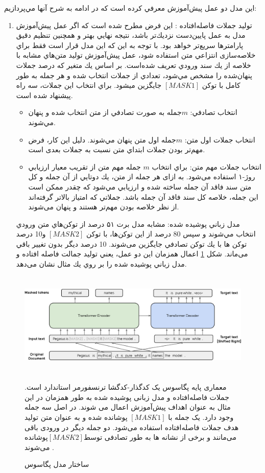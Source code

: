 این مدل دو عمل پيش‌آموزش معرفي كرده است كه در ادامه به شرح آنها مي‌پردازيم:
\begin{enumerate}
	\item {
 توليد جملات فاصله‌افتاده : اين فرض مطرح شده است كه اگر عمل پيش‌آموزش مدل به عمل
پايين‌دست 
 نزديك‌تر باشد، نتیجه نهايي بهتر و همچنين تنظیم دقیق پارامترها
  سريع‌تر خواهد بود. با توجه به اين كه اين مدل قرار است فقط براي خلاصه‌سازی انتزاعي متن استفاده شود، عمل
پيش‌آموزش توليد متن‌هاي مشابه با خلاصه از يك سند ورودي تعریف شده‌است. بر اساس يك
متغیر كه درصد جملات پنهان‌شده را مشخص مي‌شود، تعدادي از جملات انتخاب شده و هر جمله
به طور كامل با توكن $ [MASK1] $  جايگزين ميشود. براي انتخاب اين جملات، سه راه پيشنهاد
شده است.
\begin{itemize}
	\item {
	انتخاب تصادفي: $ m  $جمله به صورت تصادفي از متن انتخاب شده و پنهان مي‌شوند.
}
	\item{
	 انتخاب جملات اول متن: $ m  $جمله اول متن پنهان مي‌شوند. دليل اين كار، فرض مهم‌تر
	بودن جملات ابتداي متن نسبت به جملات بعدی است.
}
	\item{
	انتخاب جملات مهم متن: براي انتخاب $ m $ جمله مهم متن از تقريب معيار ارزيابي روژ-۱
	استفاده می‌شود. به ازای هر
	جمله از متن، يك دوتايي از آن جمله و كل متن سند فاقد آن جمله ساخته شده و ارزيابي
	مي‌شود كه چقدر ممکن است اين جمله، خلاصه كل سند فاقد آن جمله باشد. جملاتي
	كه امتیاز بالاتر گرفته‌اند از نظر خلاصه بودن مهم‌تر هستند و پنهان می‌شوند.
}
	
	
\end{itemize}
}
{ مدل زباني پوشيده شده: مشابه مدل برت ۵۱ درصد از توكن‌هاي متن ورودي انتخاب
مي‌شوند و سپس 80 درصد از اين توكن‌ها، با توكن  $ [MASK2] $  و10 درصد توكن ها با يك توكن
تصادفي جايگزين می‌شوند. 10 درصد ديگر بدون تغيير باقي می‌ماند.
شكل \ref{fig:pegasus} اعمال همزمان اين دو عمل، يعني توليد جمالت فاصله افتاده و مدل زباني پوشيده شده
را بر روي يك مثال نشان می‌دهد.
}
\end{enumerate}

 \begin{figure}[!h]
	\begin{center}
		\includegraphics[height=5cm]{pegasus.png}
	\end{center}
	\caption{ ساختار مدل پگاسوس \cite{zhang2020pegasus}}
	\label{fig:pegasus}
	\medskip
	\small{
معماری پایه پگاسوس یک کدگذار-کدگشا ترنسفورمر استاندارد است. جملات فاصله‌افتاده و مدل زبانی پوشیده شده به طور همزمان در این مثال به عنوان اهداف پيش‌آموزش اعمال می شوند. در اصل سه جمله وجود دارد. یک جمله با $ [MASK1] $ پوشانده شده و به عنوان متن تولید هدف  جملات فاصله‌افتاده استفاده می‌شود. دو جمله دیگر در ورودی باقی می‌مانند و برخی از نشانه ها به طور تصادفی توسط$ [MASK2]  $پوشانده می‌شوند
\cite{zhang2020pegasus}.}
 \end{figure}

